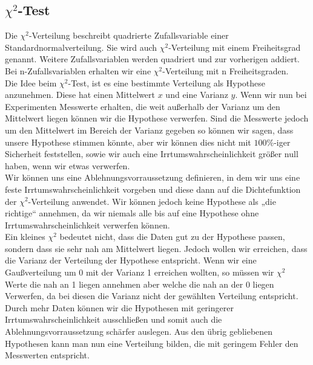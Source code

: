 \documentclass{article}
\begin{document}
	\subsection{$\chi^2$-Test}
	Die $\chi^2$-Verteilung beschreibt quadrierte Zufallsvariable einer Standardnormalverteilung. Sie wird auch $\chi^2$-Verteilung mit einem Freiheitsgrad genannt. Weitere Zufallsvariablen werden quadriert und zur vorherigen addiert. Bei n-Zufallsvariablen erhalten wir eine $\chi^2$-Verteilung mit n Freiheitsgraden.\\
	Die Idee beim $\chi^2$-Test, ist es eine bestimmte Verteilung als Hypothese anzunehmen. Diese hat einen Mittelwert $x$ und eine Varianz $y$. Wenn wir nun bei Experimenten Messwerte erhalten, die weit außerhalb der Varianz um den Mittelwert liegen können wir die Hypothese verwerfen. Sind die Messwerte jedoch um den Mittelwert im Bereich der Varianz gegeben so können wir sagen, dass unsere Hypothese stimmen könnte, aber wir können dies nicht mit $100 \%$-iger Sicherheit feststellen, sowie wir auch eine Irrtumswahrscheinlichkeit größer null haben, wenn wir etwas verwerfen.\\
	Wir können uns eine Ablehnungsvorraussetzung definieren, in dem wir uns eine feste Irrtumswahrscheinlichkeit vorgeben und diese dann auf die Dichtefunktion der $\chi^2$-Verteilung anwendet. Wir können jedoch keine Hypothese als „die richtige“ annehmen, da wir niemals alle bis auf eine Hypothese ohne Irrtumswahrscheinlichkeit verwerfen können.\\
	Ein kleines $\chi^2$ bedeutet nicht, dass die Daten gut zu der Hypothese passen, sondern dass sie sehr nah am Mittelwert liegen. Jedoch wollen wir erreichen, dass die Varianz der Verteilung der Hypothese entspricht. Wenn wir eine Gaußverteilung um 0 mit der Varianz 1 erreichen wollten, so müssen wir $\chi^2$ Werte die nah an 1 liegen annehmen aber welche die nah an der 0 liegen Verwerfen, da bei diesen die Varianz nicht der gewählten Verteilung entspricht. 
	Durch mehr Daten können wir die Hypothesen mit geringerer Irrtumswahrscheinlichkeit ausschließen und somit auch die Ablehnungsvorraussetzung schärfer auslegen. Aus den übrig gebliebenen Hypothesen kann man nun eine Verteilung bilden, die mit geringem Fehler den Messwerten entspricht.
	\newpage
\end{document}
